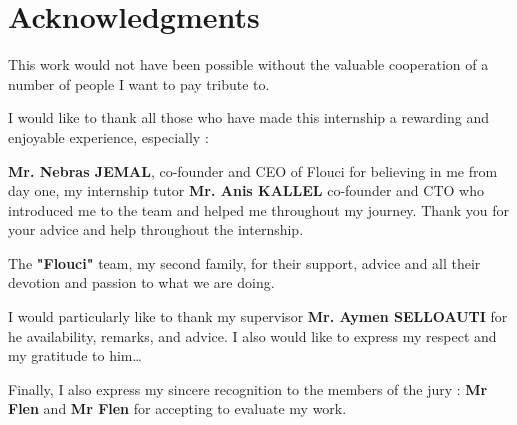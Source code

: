 \chapter*{Acknowledgments}

This work would not have been possible without the valuable cooperation of a number of people I want to pay tribute to.\newline

I would like to thank all those who have made this internship a rewarding and enjoyable experience, especially :\newline

\textbf{Mr. Nebras JEMAL}, co-founder and CEO of Flouci for believing in me from day one, my internship tutor \textbf{Mr. Anis KALLEL} co-founder and CTO who introduced me to the team and helped me throughout my journey. Thank you for your advice and help throughout the internship. \newline

The \textbf{"Flouci"} team, my second family, for their support, advice and all their devotion and passion to what we are doing.\newline

I would particularly like to thank my supervisor \textbf{Mr. Aymen SELLOAUTI} for he availability, remarks, and advice. I also would like to express my respect and my gratitude to him\dots\newline

Finally, I also express my sincere recognition to the members of the jury : \textbf{Mr Flen} and \textbf{Mr Flen} for accepting to evaluate my work.

